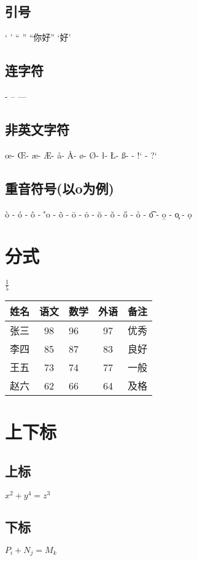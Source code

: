 \documentclass{article}
\begin{document}
	\subsection{引号}
	`   '   ``   ''    ``你好''    `好'
	
	\subsection{连字符}
	-    --    ---
	
	\subsection{非英文字符}
	\oe  -  \OE  -  \ae  -  \AE  -  \aa  -  \AA  -  \o  -  \O  -  
	\l   - \L  -  \ss  -  \SS  -  !`   -  ?`
	
	\subsection{重音符号(以o为例)}
	\`o - \'o - \^o - \''o - \~o - \=o - \.o - \u{o} - \v{o} - \H{o} - 
	\r{o} - \t{o} - \b{o} - \c{o} - \d{o}

  \section{分式}
	$\frac{1}{5}$

	
  \begin{tabular}{l|c|p{1.5cm}|c|r}  %
		\hline %
		姓名 & 语文 & 数学 & 外语 & 备注 \\ %
		\hline
		张三 & 98 & 96 & 97 & 优秀 \\
		\hline
		李四 & 85 & 87 & 83 & 良好 \\
		\hline
		王五 & 73 & 74 & 77 & 一般 \\
		\hline
		赵六 & 62 & 66 & 64 & 及格 \\
		\hline
	\end{tabular}

  \section{上下标}
	\subsection{上标}
	$x^2+y^4=z^3$
	\subsection{下标}
	$P_i+N_j=M_k$
\end{document}
